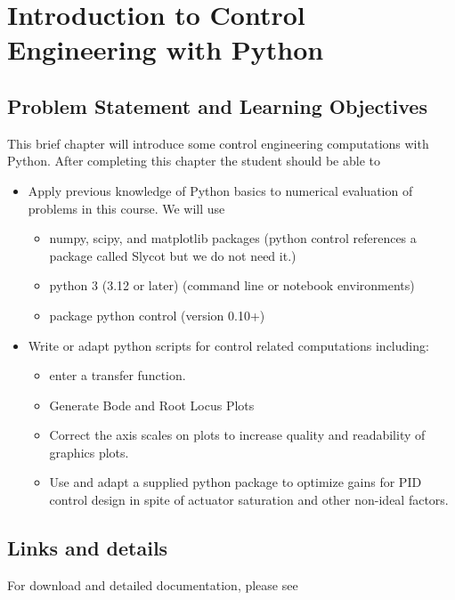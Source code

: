 %
%
%

\chapter{Introduction to Control Engineering with Python}

\section{Problem Statement and Learning Objectives}

This brief chapter will introduce
some control engineering computations with Python.  After completing this
chapter the student should be able to
\begin{itemize}
    \item Apply previous knowledge of Python basics to numerical evaluation of problems in this
    course.   We will use
    \begin{itemize}
            \item numpy, scipy, and matplotlib packages (python control references a package called Slycot but we do not need it.)
            \item python 3 (3.12 or later)  (command line or notebook environments)
            \item package python control (version 0.10+)
    \end{itemize}
    \item Write or adapt python scripts for control related computations including:
    \begin{itemize}
        \item enter a transfer function.
        \item Generate Bode and Root Locus Plots
        \item Correct the axis scales on plots to increase quality and readability of
        graphics plots.
        \item Use and adapt a supplied python package to optimize gains for PID control
        design in spite of actuator saturation and other non-ideal factors.
    \end{itemize}
\end{itemize}



\section{Links and details}
For download and detailed documentation, please see

